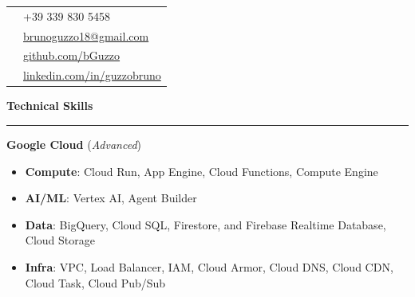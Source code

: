 \documentclass[9pt, a4paper]{article}
\newcommand{\cvsection}[1]{%
	\vspace{2pt}\par
	{\Large\bfseries\color{sectionblue}#1}\par
	\vspace{2pt}\hrule\vspace{6pt}
}
\begin{document}
	\begin{minipage}[t]{0.3\linewidth}
		\vspace{0pt} %
		
		\begin{center}
		\end{center}
		
		\begin{tabularx}{\linewidth}{@{}lX@{}}
			\faPhone & +39 339 830 5458 \\
			\faEnvelope & \href{mailto:brunoguzzo18@gmail.com}{brunoguzzo18@gmail.com} \\
			\faGithub & \href{https://github.com/bGuzzo}{github.com/bGuzzo} \\
			\faLinkedin & \href{https://www.linkedin.com/in/guzzobruno/}{linkedin.com/in/guzzobruno} \\
		\end{tabularx}
		\vspace{4pt}
		
		\cvsection{Technical Skills}
		
		{\bfseries Google Cloud} (\textit{Advanced})
		\begin{itemize}[leftmargin=*, nosep, itemsep=2pt]
			\footnotesize
			\item \textbf{Compute}: Cloud Run, App Engine, Cloud Functions, Compute Engine
			\item \textbf{AI/ML}: Vertex AI, Agent Builder
			\item \textbf{Data}: BigQuery, Cloud SQL, Firestore, and Firebase Realtime Database, Cloud Storage
			\item \textbf{Infra}: VPC, Load Balancer, IAM, Cloud Armor, Cloud DNS, Cloud CDN, Cloud Task, Cloud Pub/Sub
		\end{itemize}
		\vspace{4pt}
		

\end{minipage}
\end{document}

